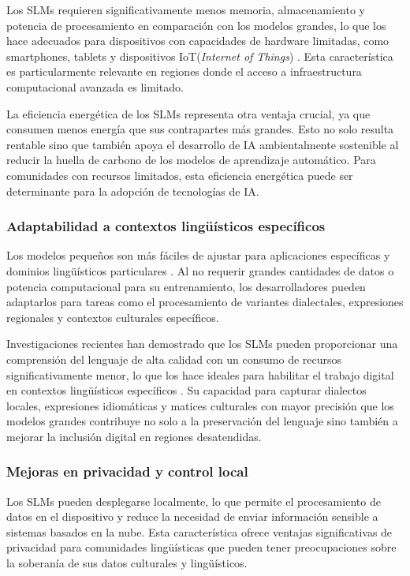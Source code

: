 \documentclass[10pt,twoside]{rcmart} %
\begin{document}
Los SLMs requieren significativamente menos memoria, almacenamiento y potencia de procesamiento en comparación con los modelos grandes, lo que los hace adecuados para dispositivos con capacidades de hardware limitadas, como smartphones, tablets y dispositivos IoT(\textit{Internet of Things}) \cite{tonja2024inkubalm}. Esta característica es particularmente relevante en regiones donde el acceso a infraestructura computacional avanzada es limitado.

La eficiencia energética de los SLMs representa otra ventaja crucial, ya que consumen menos energía que sus contrapartes más grandes. Esto no solo resulta rentable sino que también apoya el desarrollo de IA ambientalmente sostenible al reducir la huella de carbono de los modelos de aprendizaje automático. Para comunidades con recursos limitados, esta eficiencia energética puede ser determinante para la adopción de tecnologías de IA.

\subsubsection{Adaptabilidad a contextos lingüísticos específicos}

Los modelos pequeños son más fáciles de ajustar para aplicaciones específicas y dominios lingüísticos particulares \cite{hu2024fox}. Al no requerir grandes cantidades de datos o potencia computacional para su entrenamiento, los desarrolladores pueden adaptarlos para tareas como el procesamiento de variantes dialectales, expresiones regionales y contextos culturales específicos.

Investigaciones recientes han demostrado que los SLMs pueden proporcionar una comprensión del lenguaje de alta calidad con un consumo de recursos significativamente menor, lo que los hace ideales para habilitar el trabajo digital en contextos lingüísticos específicos \cite{dong2411hymba}. Su capacidad para capturar dialectos locales, expresiones idiomáticas y matices culturales con mayor precisión que los modelos grandes contribuye no solo a la preservación del lenguaje sino también a mejorar la inclusión digital en regiones desatendidas.

\subsubsection{Mejoras en privacidad y control local}

Los SLMs pueden desplegarse localmente, lo que permite el procesamiento de datos en el dispositivo y reduce la necesidad de enviar información sensible a sistemas basados en la nube. Esta característica ofrece ventajas significativas de privacidad para comunidades lingüísticas que pueden tener preocupaciones sobre la soberanía de sus datos culturales y lingüísticos.
\end{document}
